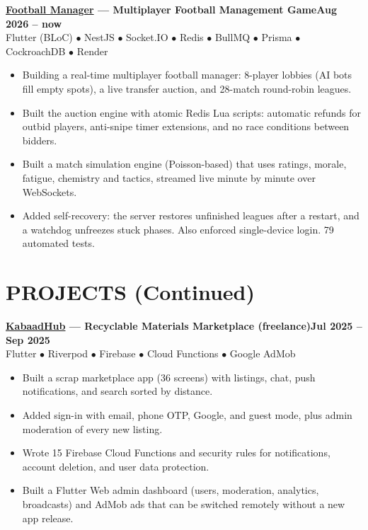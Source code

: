 \documentclass[10pt,a4paper]{article}
\newcommand{\entry}[3]{%
  \vspace{4pt}
  \textbf{#1}\hfill\textbf{#2}\\
  {\small #3}\par
}
\begin{document}
\entry{\href{https://soufyanrachdi.vercel.app/projects/football-manager}{Football Manager} --- Multiplayer Football Management Game}{Aug 2026 -- now}
{Flutter (BLoC) $\bullet$ NestJS $\bullet$ Socket.IO $\bullet$ Redis $\bullet$ BullMQ $\bullet$ Prisma $\bullet$ CockroachDB $\bullet$ Render}
\begin{itemize}
  \item Building a real-time multiplayer football manager: 8-player lobbies (AI bots fill empty spots), a live transfer auction, and 28-match round-robin leagues.
  \item Built the auction engine with atomic Redis Lua scripts: automatic refunds for outbid players, anti-snipe timer extensions, and no race conditions between bidders.
  \item Built a match simulation engine (Poisson-based) that uses ratings, morale, fatigue, chemistry and tactics, streamed live minute by minute over WebSockets.
  \item Added self-recovery: the server restores unfinished leagues after a restart, and a watchdog unfreezes stuck phases. Also enforced single-device login. 79 automated tests.
\end{itemize}

\clearpage

\section*{PROJECTS (Continued)}

\entry{\href{https://play.google.com/store/apps/details?id=com.kabaadhub.app}{KabaadHub} --- Recyclable Materials Marketplace (freelance)}{Jul 2025 -- Sep 2025}
{Flutter $\bullet$ Riverpod $\bullet$ Firebase $\bullet$ Cloud Functions $\bullet$ Google AdMob}
\begin{itemize}
  \item Built a scrap marketplace app (36 screens) with listings, chat, push notifications, and search sorted by distance.
  \item Added sign-in with email, phone OTP, Google, and guest mode, plus admin moderation of every new listing.
  \item Wrote 15 Firebase Cloud Functions and security rules for notifications, account deletion, and user data protection.
  \item Built a Flutter Web admin dashboard (users, moderation, analytics, broadcasts) and AdMob ads that can be switched remotely without a new app release.
\end{itemize}
\end{document}
